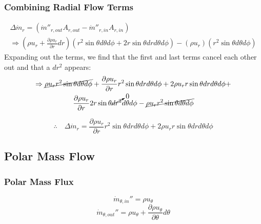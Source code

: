 \documentclass[12pt, letterpaper, twoside]{article}
\begin{document}
        \subsubsection{Combining Radial Flow Terms}
            \begin{multline*}
                \Delta\dot{m}_r = (\dot{m}''_{r,out} A_{r,out} - \dot{m}''_{r,in} A_{r,in}) 
                \\\Rightarrow
                \left(\rho u_r  + \frac{\partial \rho u_r}{\partial r} dr\right)\left(r^2 \sin\theta d\theta d\phi + 2r\sin\theta dr d\theta d\phi\right) -
                \left(\rho u_r\right)\left(r^2 \sin\theta d\theta d\phi\right)
            \end{multline*}
            Expanding out the terms, we find that the first and last terms cancel each other out and that a \(dr^2\) appears:
            \begin{multline*}
                \Rightarrow
                \cancel{\rho u_r r^2 \sin\theta d\theta d\phi} +
                \frac{\partial \rho u_r}{\partial r} r^2 \sin\theta dr d\theta d\phi +
                2\rho u_r r\sin\theta dr d\theta d\phi + \\
                \frac{\partial \rho u_r}{\partial r} 2r\sin\theta \cancelto{0}{dr^2} d\theta d\phi - 
                \cancel{\rho u_r r^2 \sin\theta d\theta d\phi}
            \end{multline*}

            \begin{equation}\label{eq:mdotr}
                \therefore\quad
                \boxed{\Delta\dot{m}_r = \frac{\partial \rho u_r}{\partial r} r^2 \sin\theta dr d\theta d\phi +
                2\rho u_r r\sin\theta dr d\theta d\phi}
            \end{equation}

    \subsection{Polar Mass Flow}
        \subsubsection{Polar Mass Flux}
            \begin{equation}
                \dot{m}_{\theta,in}'' = \rho u_{\theta}
            \end{equation}
            \begin{equation}
                \dot{m}_{\theta,out}'' = \rho u_{\theta}  +
                \frac{\partial \rho u_{\theta}}{\partial \theta} d\theta
            \end{equation}
\end{document}
